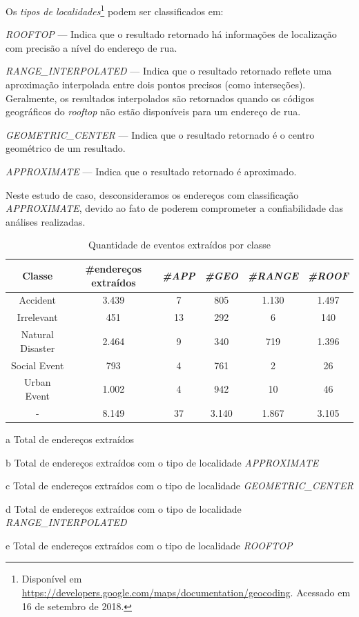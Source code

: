 \documentclass[
	12pt,				%
	oneside,			%
	a4paper,			%
	english,			%
	brazil				%
	]{abntex2ppgsi}
\begin{document}
Os \textit{tipos de localidades}\footnote{Disponível em \url{https://developers.google.com/maps/documentation/geocoding}. Acessado em 16 de setembro de 2018.} podem ser classificados em:
\begin{enumerate*}
\item \textit{ROOFTOP} --- Indica que o resultado retornado há informações de localização com precisão a nível do endereço de rua.
\item \textit{RANGE\_INTERPOLATED} --- Indica que o resultado retornado reflete uma aproximação interpolada entre dois pontos precisos (como interseções). Geralmente, os resultados interpolados são retornados quando os códigos geográficos do \textit{rooftop} não estão disponíveis para um endereço de rua.
\item \textit{GEOMETRIC\_CENTER} --- Indica que o resultado retornado é o centro geométrico de um resultado.
\item \textit{APPROXIMATE} --- Indica que o resultado retornado é aproximado.
\end{enumerate*}

Neste estudo de caso, desconsideramos os endereços com classificação \textit{APPROXIMATE}, devido ao fato de poderem comprometer a confiabilidade das análises realizadas. 

\begin{table}[!htb]
\centering
\caption {Quantidade de eventos extraídos por classe}
\label {tab:qtdExtractedAddresses}
\begin{threeparttable}
\begin{tabular}{c|c|c|c|c|c}
\hline
\textbf{Classe} & \textbf{\#endereços extraídos\tnote{a}} & \textbf{\textit{\#APP\tnote{b}}} & \textbf{\textit{\#GEO\tnote{c}}} & \textbf{\textit{\#RANGE\tnote{d}}} & \textbf{\textit{\#ROOF\tnote{e}}} \\
\hline
Accident & 3.439 & 7 & 805 & 1.130 & 1.497 \\
\hline
Irrelevant & 451 & 13 & 292 & 6 & 140 \\
\hline
Natural Disaster & 2.464 & 9 & 340 & 719 & 1.396 \\
\hline
Social Event & 793 & 4 & 761 & 2 & 26 \\
\hline
Urban Event & 1.002 & 4 & 942 & 10 & 46 \\
\hline
\hline
- & 8.149 & 37 & 3.140 & 1.867 & 3.105 \\
\hline
\hline
\end{tabular}
\begin{tablenotes}
\item[a] Total de endereços extraídos
\item[b] Total de endereços extraídos com o tipo de localidade \textit{APPROXIMATE}
\item[c] Total de endereços extraídos com o tipo de localidade \textit{GEOMETRIC\_CENTER}
\item[d] Total de endereços extraídos com o tipo de localidade \textit{RANGE\_INTERPOLATED}
\item[e] Total de endereços extraídos com o tipo de localidade \textit{ROOFTOP}
\end{tablenotes}
\end{threeparttable}
\end{table}
\end{document}

